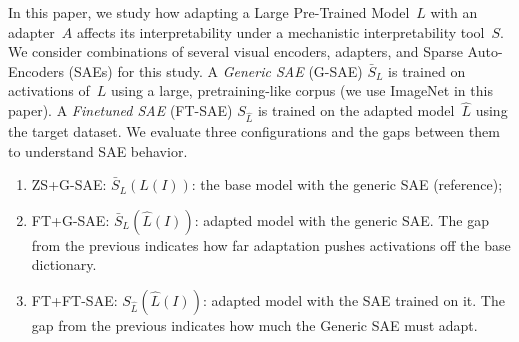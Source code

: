 

In this paper, we study how adapting a Large Pre-Trained Model~$L$ with an adapter~$A$ affects its interpretability under a mechanistic interpretability tool~$S$.
We consider combinations of several visual encoders, adapters, and Sparse Auto-Encoders (SAEs) for this study. A \emph{Generic SAE} (G-SAE) $\bar{S}_L$ is trained on activations of~$L$ using a large, pretraining-like corpus (we use ImageNet in this paper). A \emph{Finetuned SAE} (FT-SAE) $S_{\hat{L}}$ is trained on the adapted model~$\hat{L}$ using the target dataset. We evaluate three configurations and the gaps between them to understand SAE behavior.
\begin{enumerate}[leftmargin=5mm, nosep]
    \item {ZS+G-SAE}: $\bar{S}_L(L(I))$: the base model with the generic SAE (reference);
    \item {FT+G-SAE}: $\bar{S}_L(\hat{L}(I))$: adapted model with the generic SAE. The gap from the previous indicates how far adaptation pushes activations off the base dictionary.
    \item {FT+FT-SAE}: $S_{\hat{L}}(\hat{L}(I))$: adapted model with the SAE trained on it. The gap from the previous indicates how much the Generic SAE must adapt.
\end{enumerate}



